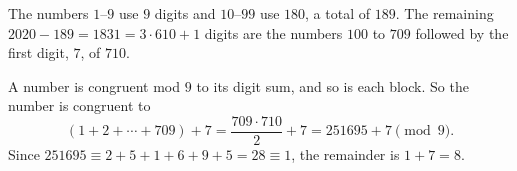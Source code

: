The numbers $1$--$9$ use $9$ digits and $10$--$99$ use $180$, a total of $189$. The remaining $2020-189=1831=3\cdot610+1$ digits are the numbers $100$ to $709$ followed by the first digit, $7$, of $710$.

A number is congruent mod $9$ to its digit sum, and so is each block. So the number is congruent to
\[(1+2+\cdots+709)+7=\dfrac{709\cdot710}{2}+7=251695+7\pmod 9.\]
Since $251695\equiv2+5+1+6+9+5=28\equiv1$, the remainder is $1+7=\boxed{8}$.

